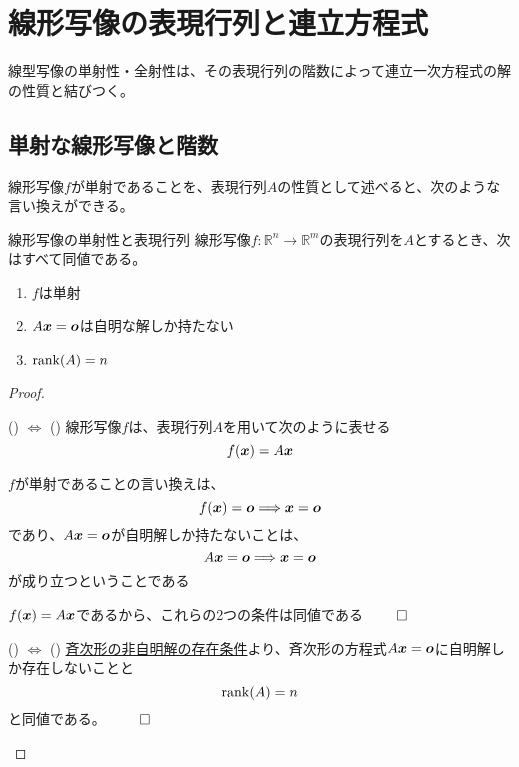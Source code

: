 \documentclass[../../../topic_linear-algebra]{subfiles}
\begin{document}
\sectionline
\section{線形写像の表現行列と連立方程式}

線型写像の単射性・全射性は、その表現行列の階数によって連立一次方程式の解の性質と結びつく。

\subsection{単射な線形写像と階数}

線形写像$f$が単射であることを、表現行列$A$の性質として述べると、次のような言い換えができる。

\begin{theorem}{線形写像の単射性と表現行列}
  線形写像$f\colon \mathbb{R}^n \to \mathbb{R}^m$の表現行列を$A$とするとき、次はすべて同値である。
  \begin{enumerate}[label=\romanlabel]
    \item $f$は単射
    \item $A\vb*{x} = \vb*{o}$は自明な解しか持たない
    \item $\rank(A) = n$
  \end{enumerate}
\end{theorem}

\begin{proof}
  \begin{subpattern}{() $\Longleftrightarrow$ ()}
    線形写像$f$は、表現行列$A$を用いて次のように表せる
    \begin{equation*}
      f(\vb*{x}) = A\vb*{x}
    \end{equation*}

    $f$が単射であることの言い換えは、
    \begin{equation*}
      f(\vb*{x}) = \vb*{o} \Longrightarrow \vb*{x} = \vb*{o}
    \end{equation*}
    であり、$A\vb*{x} = \vb*{o}$が自明解しか持たないことは、
    \begin{equation*}
      A\vb*{x} = \vb*{o} \Longrightarrow \vb*{x} = \vb*{o}
    \end{equation*}
    が成り立つということである

    $f(\vb*{x}) = A\vb*{x}$であるから、これらの2つの条件は同値である $\qed$
  \end{subpattern}

  \begin{subpattern}{() $\Longleftrightarrow$ ()}
    \hyperref[thm:homogeneous-trivial-iff-full-col-rank]{斉次形の非自明解の存在条件}より、斉次形の方程式$A\vb*{x} = \vb*{o}$に自明解しか存在しないことと
    \begin{equation*}
      \rank(A) = n
    \end{equation*}
    と同値である。 $\qed$
  \end{subpattern}
\end{proof}
\end{document}
